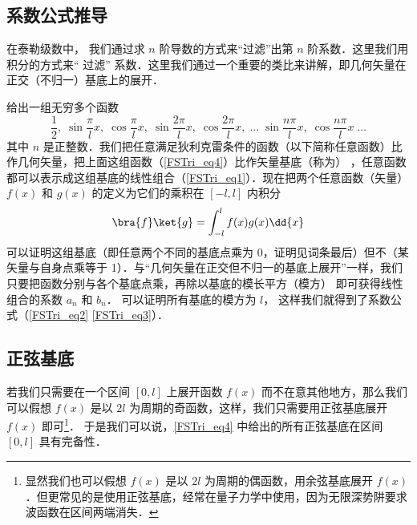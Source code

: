 \subsection{系数公式推导}

在泰勒级数中，%
我们通过求 $n$ 阶导数的方式来“过滤”出第 $n$ 阶系数．这里我们用积分的方式来“ 过滤” 系数．这里我们通过一个重要的类比来讲解，即几何矢量在正交（不归一）基底上的展开．%

% 

给出一组无穷多个函数
\begin{equation}\label{FSTri_eq4}
\frac12,\;   \sin\frac{\pi}{l} x,\;   \cos\frac{\pi}{l} x,\;   \sin\frac{2\pi}{l} x,\;   \cos\frac{2\pi}{l} x,\;   \dots\;\sin\frac{n\pi}{l} x,\;   \cos\frac{n\pi}{l} x\;   \dots
\end{equation}
其中 $n$ 是正整数．我们把任意满足狄利克雷条件的函数（以下简称任意函数）比作几何矢量，把上面这组函数（\autoref{FSTri_eq4}）比作矢量基底（称为）
，任意函数都可以表示成这组基底的线性组合（\autoref{FSTri_eq1}）．现在把两个任意函数（矢量） $f(x)$ 和 $g(x)$ 的定义为它们的乘积在 $[-l,l]$ 内积分
\begin{equation}
\bra{f}\ket{g} = \int_{-l}^{l} f(x)g(x) \dd{x}
\end{equation}
可以证明这组基底（即任意两个不同的基底点乘为 0，证明见词条最后）但不（某矢量与自身点乘等于 1）．与“几何矢量在正交但不归一的基底上展开”一样，我们只要把函数分别与各个基底点乘，再除以基底的模长平方（模方）
即可获得线性组合的系数 $a_n$ 和 $b_n$． 可以证明所有基底的模方为 $l$， 这样我们就得到了系数公式（\autoref{FSTri_eq2} \autoref{FSTri_eq3}）．


\subsection{正弦基底}
若我们只需要在一个区间 $[0,l]$ 上展开函数 $f(x)$ 而不在意其他地方，那么我们可以假想 $f(x)$ 是以 $2l$ 为周期的奇函数，这样，我们只需要用正弦基底展开 $f(x)$ 即可\footnote{显然我们也可以假想 $f(x)$ 是以 $2l$ 为周期的偶函数，用余弦基底展开 $f(x)$．但更常见的是使用正弦基底，经常在量子力学中使用，因为无限深势阱要求波函数在区间两端消失．}． 于是我们可以说，\autoref{FSTri_eq4} 中给出的所有正弦基底在区间 $[0,l]$ 具有完备性．

